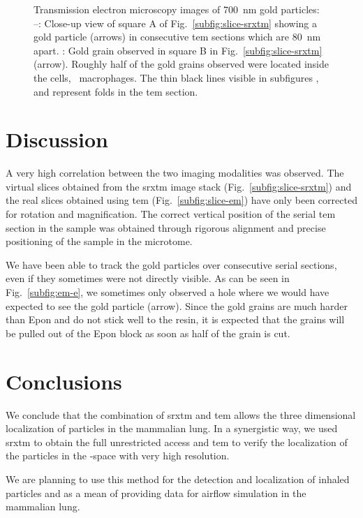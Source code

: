 \begin{figure}[htb]
{		\label{subfig:em-f}%
		}%
	\caption[Transmission electron microscopy images of gold particles]{Transmission electron microscopy images of \SI{700}{\nano\meter} gold particles: --: Close-up view of square A of Fig.~\ref{subfig:slice-srxtm} showing a gold particle (arrows) in consecutive \ac{tem} sections which are \SI{80}{\nano\meter} apart. : Gold grain observed in square B in Fig.~\ref{subfig:slice-srxtm} (arrow). Roughly half of the gold grains observed were located inside the cells, \eg\ macrophages. The thin black lines visible in subfigures ,  and  represent folds in the \ac{tem} section.}%
	\label{fig:srxtm-em}%
\end{figure}

\section{Discussion}
A very high correlation between the two imaging modalities was observed. The virtual slices obtained from the \ac{srxtm} image stack (Fig.~\ref{subfig:slice-srxtm}) and the real slices obtained using \ac{tem} (Fig.~\ref{subfig:slice-em}) have only been corrected for rotation and magnification. The correct vertical position of the serial \ac{tem} section in the sample was obtained through rigorous alignment and precise positioning of the sample in the microtome.

We have been able to track the gold particles over consecutive serial sections, even if they sometimes were not directly visible. As can be seen in Fig.~\ref{subfig:em-e}, we sometimes only observed a hole where we would have expected to see the gold particle (arrow). Since the gold grains are much harder than Epon and do not stick well to the resin, it is expected that the grains will be pulled out of the Epon block as soon as half of the grain is cut.

\section{Conclusions}
We conclude that the combination of \ac{srxtm} and \ac{tem} allows the three dimensional localization of particles in the mammalian lung. In a synergistic way, we used \ac{srxtm} to obtain the full unrestricted \threed access and \ac{tem} to verify the localization of the particles in the \threed-space with very high resolution. 

We are planning to use this method for the detection and localization of inhaled particles and as a mean of providing data for airflow simulation in the mammalian lung.

